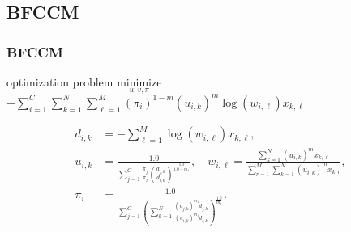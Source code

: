 \documentclass[fleqn,dvipdfmx,10pt]{beamer}
\begin{document}
\subsection{BFCCM}
\begin{frame}\frametitle{BFCCM}
  \begin{block}{optimization problem}
    $\underset{u,v,\pi}{\text{minimize}}$
    $-\sum_{i=1}^C\sum_{k=1}^N\sum_{\ell=1}^M(\pi_i)^{1-m}(u_{i,k})^m \log{(w_{i,\ell})}x_{k,\ell}$
  \end{block}
  \begin{center}
    \begin{align*}
      d_{i,k}&=-\sum_{\ell=1}^M\log(w_{i,\ell})x_{k,\ell},\\
      u_{i,k}&=\frac{1.0}{\sum_{j=1}^C\frac{\pi_{j}}{\pi_{i}}\left(\frac{d_{j,k}}{d_{i,k}}\right)^\frac{1.0}{1.0-{m_1}}},\quad
      w_{i,\ell}=\frac{\sum_{k=1}^N (u_{i,k})^m x_{k,\ell}}{\sum_{r=1}^M \sum_{k=1}^N (u_{i,k})^m x_{k,r}},\\
      \pi_{i}&=\frac{1.0}{\sum_{j=1}^C\left(\sum_{k=1}^N\frac{(u_{j,k})^{m_1}d_{j,k}}{(u_{i,k})^{m_1}d_{i,k}}\right)^{\frac{1.0}{m_1}}}.\\
    \end{align*}
  \end{center}
\end{frame}
\end{document}
